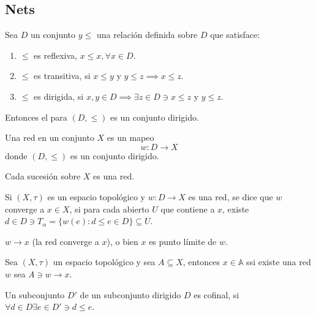 \documentclass[a4paper, 12pt]{article}
\begin{document}

\setcounter{page}{1}


\subsection{Nets}

\begin{prop}
    Sea $D$ un conjunto $y\leq$ una relación definida sobre $D$ que satisface: 
    \begin{enumerate}
        \item $\leq$ es reflexiva, $x\leq x,\forall x\in D$. 
        \item $\leq$ es transitiva, si $x\leq y$ y $y\leq z\implies x\leq z$. 
        \item $\leq$ es dirigida, si $x,y\in D\implies \exists z\in D\ni x\leq z$ y $y\leq z$.  
    \end{enumerate}
    Entonces el para $(D,\leq)$ es un conjunto dirigido. 
\end{prop}



\begin{definicion}
    Una red en un conjunto $X$ es un mapeo 
    $$w:D\to X$$
    donde $(D,\leq)$ es un conjunto dirigido.  
\end{definicion}

\begin{nota}
    Cada sucesión sobre $X$ es una red. 
\end{nota}

\begin{definicion}[Convergencia]
    Si $(X,\tau)$ es un espacio topológico y $w:D\to X$ es una red, se dice que $w$ converge a $x\in X$, si para cada abierto $U$ que contiene a $x$, existe $d\in D\ni T_\alpha=\{w(e):d\leq e\in D\}\subseteq U$. 
\end{definicion}

\begin{nota}
    $w\to x$ (la red converge a $x$), o bien $x$ es punto límite de $w$. 
\end{nota}

\begin{teorema}
    Sea $(X,\tau)$ un espacio topológico y sea $A\subseteq X$, entonces $x\in \mathbb{A}$ ssi existe una red $w$ sea $A\ni w\to x$.
\end{teorema}


\begin{nota}
    Un subconjunto $D'$ de un subconjunto dirigido $D$ es cofinal, si $\forall d\in D\exists e\in D'\ni d\leq e$. 
\end{nota}
\end{document}
